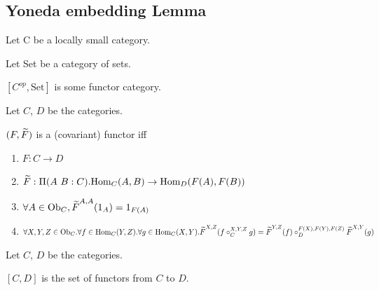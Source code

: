 \documentclass[10pt,a4paper]{article}
\begin{document}
\subsection{Yoneda embedding Lemma}
Let C be a locally small category.

Let Set be a category of sets.

$[C^{op},\textrm{Set}]$ is some functor category.


\begin{definition}
Let $C$, $D$ be the categories.

 $(F, {\widetilde{F}\textrm{}})$ is a (covariant) functor iff

\begin{enumerate}
\item $F:C \to D$
\item ${\widetilde{F}\textrm{}}:\Pi(A\ B:C).{\textrm{Hom}}_C(A,B) \to {\textrm{Hom}}_D(F(A), F(B))$
\item $\forall A\in {\textrm{Ob}}_C, {\widetilde{F}\textrm{}}^{A,A}(1_A)=1_{F(A)}$
\item $\forall X,Y,Z \in {\textrm{Ob}}_C.\forall f\in{\textrm{Hom}}_C(Y,Z).\forall g\in{\textrm{Hom}}_C(X,Y). {\widetilde{F}\textrm{}}^{X,Z}(f\circ_C^{X,Y,Z} g)={\widetilde{F}\textrm{}}^{Y,Z}(f)\circ_D^{F(X),F(Y),F(Z)} {\widetilde{F}\textrm{}}^{X,Y}(g)$
\end{enumerate}

\end{definition}

\begin{definition}
Let $C$, $D$ be the categories.

$[C,D]$ is the set of functors from $C$ to $D$.

\end{definition}

\end{document}
